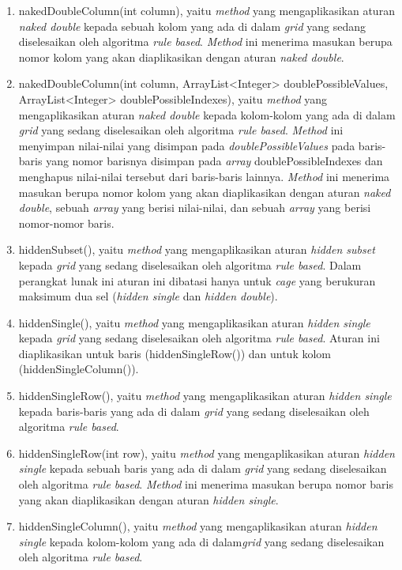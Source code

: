\begin{enumerate}
\item nakedDoubleColumn(int column), yaitu \textit{method} yang mengaplikasikan aturan \textit{naked double} kepada sebuah kolom yang ada di dalam \textit{grid} yang sedang diselesaikan oleh algoritma \textit{rule based}. \textit{Method} ini menerima masukan berupa nomor kolom yang akan diaplikasikan dengan aturan \textit{naked double}.
\item nakedDoubleColumn(int column, ArrayList<Integer> doublePossibleValues, ArrayList<Integer> doublePossibleIndexes), yaitu \textit{method} yang mengaplikasikan aturan \textit{naked double} kepada kolom-kolom yang ada di dalam \textit{grid} yang sedang diselesaikan oleh algoritma \textit{rule based}. \textit{Method} ini menyimpan nilai-nilai yang disimpan pada \textit{doublePossibleValues} pada baris-baris yang nomor barisnya disimpan pada \textit{array} doublePossibleIndexes dan menghapus nilai-nilai tersebut dari baris-baris lainnya. \textit{Method} ini menerima masukan berupa nomor kolom yang akan diaplikasikan dengan aturan \textit{naked double}, sebuah \textit{array} yang berisi nilai-nilai, dan sebuah \textit{array} yang berisi nomor-nomor baris.
\item hiddenSubset(), yaitu \textit{method} yang mengaplikasikan aturan \textit{hidden subset} kepada \textit{grid} yang sedang diselesaikan oleh algoritma \textit{rule based}. Dalam perangkat lunak ini aturan ini dibatasi hanya untuk \textit{cage} yang berukuran maksimum dua sel (\textit{hidden single} dan \textit{hidden double}).
\item hiddenSingle(), yaitu \textit{method} yang mengaplikasikan aturan \textit{hidden single} kepada \textit{grid} yang sedang diselesaikan oleh algoritma \textit{rule based}. Aturan ini diaplikasikan untuk baris (hiddenSingleRow()) dan untuk kolom (hiddenSingleColumn()).
\item hiddenSingleRow(), yaitu \textit{method} yang mengaplikasikan aturan \textit{hidden single} kepada baris-baris yang ada di dalam \textit{grid} yang sedang diselesaikan oleh algoritma \textit{rule based}.
\item hiddenSingleRow(int row), yaitu \textit{method} yang mengaplikasikan aturan \textit{hidden single} kepada sebuah baris yang ada di dalam \textit{grid} yang sedang diselesaikan oleh algoritma \textit{rule based}. \textit{Method} ini menerima masukan berupa nomor baris yang akan diaplikasikan dengan aturan \textit{hidden single}.
\item hiddenSingleColumn(), yaitu \textit{method} yang mengaplikasikan aturan \textit{hidden single} kepada kolom-kolom yang ada di dalam\textit{grid} yang sedang diselesaikan oleh algoritma \textit{rule based}.

\end{enumerate}
